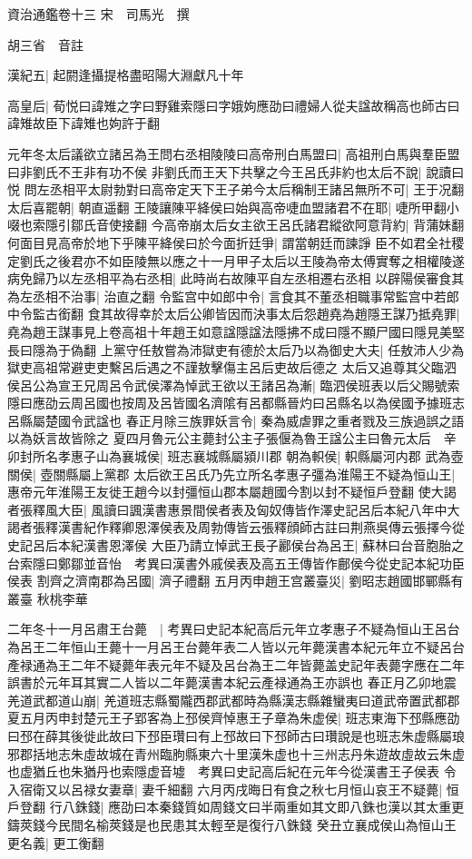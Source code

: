 資治通鑑卷十三
宋　司馬光　撰

胡三省　音註

漢紀五|{
	起閼逢攝提格盡昭陽大淵獻凡十年}


高皇后|{
	荀悦曰諱雉之字曰野雞索隱曰字娥姁應劭曰禮婦人從夫諡故稱高也師古曰諱雉故臣下諱雉也姁許于翻}


元年冬太后議欲立諸呂為王問右丞相陵陵曰高帝刑白馬盟曰|{
	高祖刑白馬與羣臣盟曰非劉氏不王非有功不侯}
非劉氏而王天下共擊之今王呂氏非約也太后不說|{
	說讀曰悦}
問左丞相平太尉勃對曰高帝定天下王子弟今太后稱制王諸呂無所不可|{
	王于况翻}
太后喜罷朝|{
	朝直遥翻}
王陵讓陳平絳侯曰始與高帝啑血盟諸君不在耶|{
	啑所甲翻小啜也索隱引鄒氏音使接翻}
今高帝崩太后女主欲王呂氏諸君縱欲阿意背約|{
	背蒲妹翻}
何面目見高帝於地下乎陳平絳侯曰於今面折廷爭|{
	謂當朝廷而諫諍}
臣不如君全社稷定劉氏之後君亦不如臣陵無以應之十一月甲子太后以王陵為帝太傅實奪之相權陵遂病免歸乃以左丞相平為右丞相|{
	此時尚右故陳平自左丞相遷右丞相}
以辟陽侯審食其為左丞相不治事|{
	治直之翻}
令監宫中如郎中令|{
	言食其不董丞相職事常監宫中若郎中令監古銜翻}
食其故得幸於太后公卿皆因而決事太后怨趙堯為趙隱王謀乃抵堯罪|{
	堯為趙王謀事見上卷高祖十年趙王如意諡隱諡法隱拂不成曰隱不顯尸國曰隱見美堅長曰隱為于偽翻}
上黨守任敖嘗為沛獄吏有德於太后乃以為御史大夫|{
	任敖沛人少為獄吏高祖常避吏吏繫呂后遇之不謹敖擊傷主呂后吏故后德之}
太后又追尊其父臨泗侯呂公為宣王兄周呂令武侯澤為悼武王欲以王諸呂為漸|{
	臨泗侯班表以后父賜號索隱曰應劭云周呂國也按周及呂皆國名濟隂有呂都縣晉灼曰呂縣名以為侯國予據班志呂縣屬楚國令武諡也}
春正月除三族罪妖言令|{
	秦為威虐罪之重者戮及三族過誤之語以為妖言故皆除之}
夏四月魯元公主薨封公主子張偃為魯王諡公主曰魯元太后　辛卯封所名孝惠子山為襄城侯|{
	班志襄城縣屬潁川郡}
朝為軹侯|{
	軹縣屬河内郡}
武為壺關侯|{
	壺關縣屬上黨郡}
太后欲王呂氏乃先立所名孝惠子彊為淮陽王不疑為恒山王|{
	惠帝元年淮陽王友徙王趙今以封彊恒山郡本屬趙國今割以封不疑恒戶登翻}
使大謁者張釋風大臣|{
	風讀曰諷漢書惠景間侯者表及匈奴傳皆作澤史記呂后本紀八年中大謁者張釋漢書紀作釋卿恩澤侯表及周勃傳皆云張釋顔師古註曰荆燕吳傳云張擇今從史記呂后本紀漢書恩澤侯}
大臣乃請立悼武王長子酈侯台為呂王|{
	蘇林曰台音胞胎之台索隱曰鄭鄒並音怡　考異曰漢書外戚侯表及高五王傳皆作鄜侯今從史記本紀功臣侯表}
割齊之濟南郡為呂國|{
	濟子禮翻}
五月丙申趙王宫叢臺災|{
	劉昭志趙國邯鄲縣有叢臺}
秋桃李華

二年冬十一月呂肅王台薨　|{
	考異曰史記本紀高后元年立孝惠子不疑為恒山王呂台為呂王二年恒山王薨十一月呂王台薨年表二人皆以元年薨漢書本紀元年立不疑呂台產禄通為王二年不疑薨年表元年不疑及呂台為王二年皆薨盖史記年表薨字應在二年誤書於元年耳其實二人皆以二年薨漢書本紀云產禄通為王亦誤也}
春正月乙卯地震羌道武都道山崩|{
	羌道班志縣蜀隴西郡武都時為縣漢志縣雜蠻夷曰道武帝置武都郡}
夏五月丙申封楚元王子郢客為上邳侯齊悼惠王子章為朱虚侯|{
	班志東海下邳縣應劭曰邳在薛其後徙此故曰下邳臣瓚曰有上邳故曰下邳師古曰瓚說是也班志朱虚縣屬琅邪郡括地志朱虛故城在青州臨朐縣東六十里漢朱虚也十三州志丹朱遊故虛故云朱虚也虚猶丘也朱猶丹也索隱虚音墟　考異曰史記高后紀在元年今從漢書王子侯表}
令入宿衛又以呂禄女妻章|{
	妻千細翻}
六月丙戌晦日有食之秋七月恒山哀王不疑薨|{
	恒戶登翻}
行八銖錢|{
	應劭曰本秦錢質如周錢文曰半兩重如其文即八銖也漢以其太重更鑄莢錢今民間名榆莢錢是也民患其太輕至是復行八銖錢}
癸丑立襄成侯山為恒山王更名義|{
	更工衡翻}


